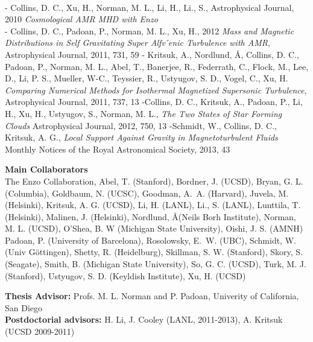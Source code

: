       \\
\noindent
- Collins, D. C., Xu, H., Norman, M. L., Li, H., Li., S., Astrophysical Journal, 2010
{\sl Cosmological AMR MHD with Enzo}\\
\noindent
- Collins, D. C., Padoan, P., Norman, M. L., Xu, H., 2012
{\sl  Mass and Magnetic Distributions in Self Gravitating Super Alfv ́enic
Turbulence with AMR},  Astrophysical Journal, 2011, 731, 59
\noindent
- Kritsuk, A., Nordlund, \AA, Collins, D. C., Padoan, P., Norman, M. L., Abel,
T., Banerjee, R., Federrath, C., Flock, M., Lee, D., Li, P. S., Mueller, W-C.,
Teyssier, R., Ustyugov, S. D., Vogel, C., Xu, H.
{\sl  Comparing Numerical Methods for Isothermal Magnetized Supersonic
Turbulence},  Astrophysical Journal, 2011, 737, 13
\noindent
-Collins, D. C., Kritsuk, A., Padoan, P., Li, H., Xu, H., Ustyugov, S., Norman,
M. L., 
{\sl The Two States of Star Forming Clouds} Astrophysical Journal, 2012, 750, 13
-Schmidt, W., Collins, D. C., Kritsuk, A. G.,
{\sl Local Support Against Gravity in Magnetoturbulent Fluids} Monthly Notices
of the Royal Astronomical Society, 2013, 43

\noindent
{\large\bf Main Collaborators}\\
The Enzo Collaboration,  Abel, T. (Stanford),   Bordner, J.
(UCSD),   Bryan, G. L. (Columbia), 
Goldbaum, N. (UCSC),   Goodman, A.~A.
(Harvard),    Juvela, M. (Helsinki),     Kritsuk, A. G. (UCSD),   Li, H.
(LANL), Li., S. (LANL), Lunttila, T. (Helsinki),
Malinen, J. (Helsinki), Nordlund, \AA (Neils Borh
Institute),   Norman, M. L. (UCSD),    O'Shea, B. W (Michigan State
University),
Oishi, J. S. (AMNH)   Padoan, P. (University of Barcelona),   
Rosolowsky, E.~W. (UBC),   Schmidt, W. (Univ
G\"ottingen),   Shetty, R. (Heidelburg), 
Skillman,
S. W. (Stanford),    Skory, S. (Seagate), Smith, B. (Michigan State
University),
So, G. C. (UCSD),   
Turk, M. J. (Stanford), Ustyugov, S. D. (Keyldish Institute),
Xu, H. (UCSD)

\noindent
 {\large\bf Thesis Advisor:} Profs. M. L. Norman and P. Padoan, Univerity of
 California, San Diego\\
 {\large\bf Postdoctorial advisors:} H. Li, J. Cooley (LANL, 2011-2013), A.
 Kritsuk (UCSD 2009-2011)


